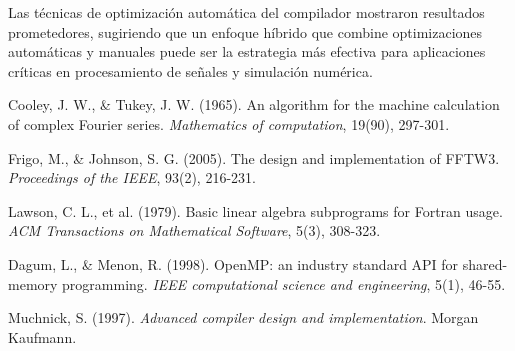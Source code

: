 \documentclass[a4paper]{article}
\begin{document}
Las técnicas de optimización automática del compilador mostraron resultados prometedores, sugiriendo que un enfoque híbrido que combine optimizaciones automáticas y manuales puede ser la estrategia más efectiva para aplicaciones críticas en procesamiento de señales y simulación numérica.

\begin{thebibliography}{9}
    Cooley, J. W., \& Tukey, J. W. (1965). An algorithm for the machine calculation of complex Fourier series. \textit{Mathematics of computation}, 19(90), 297-301.

    Frigo, M., \& Johnson, S. G. (2005). The design and implementation of FFTW3. \textit{Proceedings of the IEEE}, 93(2), 216-231.

    Lawson, C. L., et al. (1979). Basic linear algebra subprograms for Fortran usage. \textit{ACM Transactions on Mathematical Software}, 5(3), 308-323.

    Dagum, L., \& Menon, R. (1998). OpenMP: an industry standard API for shared-memory programming. \textit{IEEE computational science and engineering}, 5(1), 46-55.

    Muchnick, S. (1997). \textit{Advanced compiler design and implementation}. Morgan Kaufmann.
\end{thebibliography}
\end{document}

